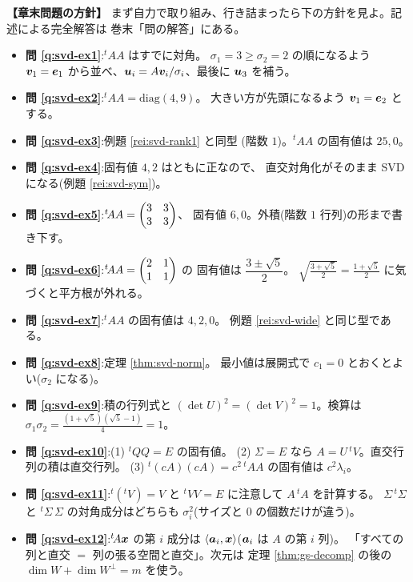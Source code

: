 \bigskip
{\small
\noindent\textbf{【章末問題の方針】}\quad
まず自力で取り組み、行き詰まったら下の方針を見よ。記述による完全解答は
巻末「問の解答」にある。
\begin{itemize}
\item \textbf{問 \ref{q:svd-ex1}}:${}^t\!AA$ はすでに対角。
$\sigma_1 = 3 \ge \sigma_2 = 2$ の順になるよう $\bm{v}_1 = \bm{e}_1$
から並べ、$\bm{u}_i = A\bm{v}_i/\sigma_i$、最後に $\bm{u}_3$ を補う。
\item \textbf{問 \ref{q:svd-ex2}}:${}^t\!AA = \mathrm{diag}(4, 9)$。
大きい方が先頭になるよう $\bm{v}_1 = \bm{e}_2$ とする。
\item \textbf{問 \ref{q:svd-ex3}}:例題 \ref{rei:svd-rank1} と同型
(階数 $1$)。${}^t\!AA$ の固有値は $25, 0$。
\item \textbf{問 \ref{q:svd-ex4}}:固有値 $4, 2$ はともに正なので、
直交対角化がそのまま SVD になる(例題 \ref{rei:svd-sym})。
\item \textbf{問 \ref{q:svd-ex5}}:${}^t\!AA = \begin{pmatrix}3 & 3 \\ 3 & 3\end{pmatrix}$、
固有値 $6, 0$。外積(階数 $1$ 行列)の形まで書き下す。
\item \textbf{問 \ref{q:svd-ex6}}:${}^t\!AA = \begin{pmatrix}2 & 1 \\ 1 & 1\end{pmatrix}$ の
固有値は $\dfrac{3 \pm \sqrt{5}}{2}$。
$\sqrt{\frac{3+\sqrt{5}}{2}} = \frac{1+\sqrt{5}}{2}$ に気づくと平方根が外れる。
\item \textbf{問 \ref{q:svd-ex7}}:${}^t\!AA$ の固有値は $4, 2, 0$。
例題 \ref{rei:svd-wide} と同じ型である。
\item \textbf{問 \ref{q:svd-ex8}}:定理 \ref{thm:svd-norm}。
最小値は展開式で $c_1 = 0$ とおくとよい($\sigma_2$ になる)。
\item \textbf{問 \ref{q:svd-ex9}}:積の行列式と
$(\det U)^2 = (\det V)^2 = 1$。検算は $\sigma_1\sigma_2 =
\frac{(1+\sqrt{5})(\sqrt{5}-1)}{4} = 1$。
\item \textbf{問 \ref{q:svd-ex10}}:(1) ${}^tQQ = E$ の固有値。
(2) $\Sigma = E$ なら $A = U\,{}^tV$。直交行列の積は直交行列。
(3) ${}^t(cA)(cA) = c^2\,{}^t\!AA$ の固有値は $c^2\lambda_i$。
\item \textbf{問 \ref{q:svd-ex11}}:${}^t({}^tV) = V$ と
${}^tVV = E$ に注意して $A\,{}^t\!A$ を計算する。
$\Sigma\,{}^t\Sigma$ と ${}^t\Sigma\,\Sigma$ の対角成分はどちらも
$\sigma_i^2$(サイズと $0$ の個数だけが違う)。
\item \textbf{問 \ref{q:svd-ex12}}:${}^t\!A\bm{x}$ の第 $i$ 成分は
$\langle \bm{a}_i, \bm{x} \rangle$($\bm{a}_i$ は $A$ の第 $i$ 列)。
「すべての列と直交 $=$ 列の張る空間と直交」。次元は
定理 \ref{thm:gs-decomp} の後の $\dim W + \dim W^{\perp} = m$ を使う。
\end{itemize}
}

